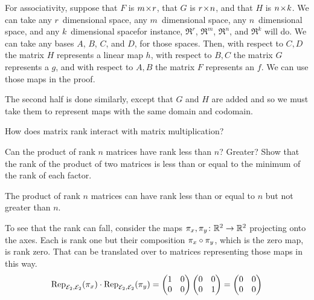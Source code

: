 \begin{exercises}
\begin{answer}
      For associativity, 
      suppose that $F$ is $\nbym{m}{r}$, that $G$ is $\nbym{r}{n}$, and
      that $H$ is $\nbym{n}{k}$.
      We can take any $r$~dimensional space, 
      any $m$~dimensional space, any $n$~dimensional space, and any
      $k$~dimensional space\Dash for instance, 
      $\Re^r$, $\Re^m$, $\Re^n$, and $\Re^k$ will do.
      We can take any bases $A$, $B$, $C$, and $D$, for those spaces.
      Then, 
      with respect to $C,D$ the matrix $H$ represents a linear map $h$,
      with respect to $B,C$ the matrix $G$ represents a $g$,
      and with respect to $A,B$ the matrix $F$ represents an $f$.
      We can use those maps in the proof.
      
      The second half is done similarly, except that $G$ and $H$ are added 
      and so we must take them to represent maps with the same domain 
      and codomain.
    \end{answer}
  \item \label{exer:RankProdLeqRankFacts}
    How does matrix rank interact with matrix multiplication?
    \begin{exparts}
      \partsitem Can the product of rank \( n \) matrices have rank less 
        than \( n \)?
        Greater?
      \partsitem  Show that the rank of the product of two matrices is less 
        than or equal to the minimum of the rank of each factor.
    \end{exparts}
    \begin{answer}
     \begin{exparts}
      \partsitem The product of rank \( n \) matrices can have rank less 
        than or equal to \( n \) but not greater than \( n \).

        To see that the rank can fall,
        consider the maps \( \map{\pi_x,\pi_y}{\Re^2}{\Re^2} \) projecting onto
        the axes. 
        Each is rank one but their composition
        $\composed{\pi_x}{\pi_y}$, which is the zero map, is rank zero.
        That can be translated over to matrices representing those 
        maps in this way.
        \begin{equation*}
          \rep{\pi_x}{\stdbasis_2,\stdbasis_2}\cdot\rep{\pi_y}{\stdbasis_2,\stdbasis_2}=
          \begin{pmatrix}
            1  &0  \\
            0  &0
          \end{pmatrix}
          \begin{pmatrix}
            0  &0  \\
            0  &1
          \end{pmatrix}=
          \begin{pmatrix}
            0  &0  \\
            0  &0
          \end{pmatrix}
        \end{equation*}


\end{exparts}
\end{answer}
\end{exercises}
